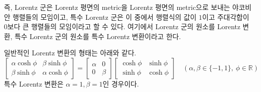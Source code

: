 \documentclass[10pt,a4paper]{article}
\begin{document}
즉, Lorentz 군은 Lorentz 평면의 metric을 Lorentz 평면의 metric으로 보내는 야코비안 행렬들의 모임이고, 특수 Lorentz 군은 이 중에서 행렬식의 값이 $1$이고 주대각합이 $0$보다 큰 행렬들의 모임이라고 할 수 있다. 여기에서 Lorentz 군의 원소를 Lorentz 변환, 특수 Lorentz 군의 원소를 특수 Lorentz 변환이라고 한다.

\begin{tcolorbox}[title=Lorentz 변환의 형태\null]
일반적인 Lorentz 변환의 형태는 아래와 같다.\[
\begin{bmatrix}
    \alpha \cosh{\phi} & \beta \sinh{\phi}\\
    \beta \sinh{\phi} & \alpha \cosh{\phi}
\end{bmatrix} = \begin{bmatrix}
    \alpha & 0 \\
    0 & \beta 
\end{bmatrix}\begin{bmatrix}
    \cosh{\phi} & \sinh{\phi}\\
    \sinh{\phi} & \cosh{\phi}
\end{bmatrix}\quad(\alpha, \beta \in \{-1, 1\},~\phi \in \mathbb{R})
\]
특수 Lorentz 변환은 $\alpha = 1, \beta = 1$인 경우이다.
\end{tcolorbox}
\end{document}
